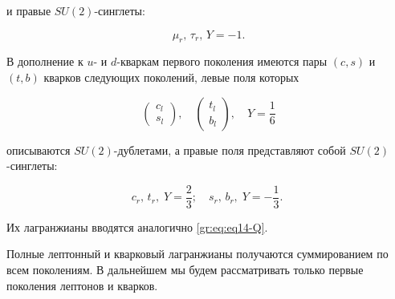 и правые  $SU(2)$-синглеты:

$$ %

\mu_r, \, \tau_r,\,  Y=-1.


$$ %

%

В дополнение к $u$- и $d$-кваркам первого поколения имеются пары $(c,s)$ и  $(t,b)$ кварков следующих поколений, левые поля которых

 \begin{equation}

 \left(

\begin{array}{c}

	c_l\\

	s_l

\end{array} \right), \quad

\left(

\begin{array}{c}

	t_l\\

	b_l

\end{array} \right), \quad Y=\frac{1}{6}

\label{gr:eq:eq14-1Q}

\end{equation}

описываются $SU(2)$-дублетами, а правые поля представляют собой $SU(2)$-син\-гле\-ты:

$$%

c_r,\, t_r, \; Y=\frac{2}{3}; \quad 

s_r,\, b_r, \; Y=-\frac{1}{3}. \;


$$%

 Их лагранжианы вводятся аналогично \eqref{gr:eq:eq14-Q}.

 Полные лептонный и кварковый лагранжианы получаются суммированием по всем поколениям. В дальнейшем мы будем рассматривать только первые поколения лептонов и кварков.



\smallskip



